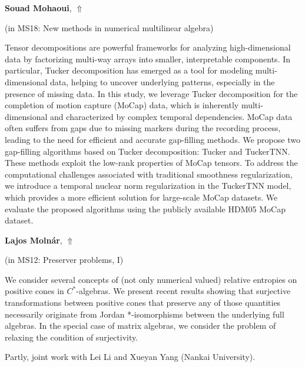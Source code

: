 \documentclass[ILAS2025-program.tex]{subfiles}
\begin{document}
\hypertarget{down0191}{}\begin{ilasabstract}
    
\textbf{Souad Mohaoui},  \hfill \hyperlink{up0191}{$\Uparrow$}
    
    
(in {\color{mstitle}MS18: New methods in numerical multilinear algebra})
        
\mtskip
    Tensor decompositions are powerful frameworks for analyzing high-dimensional data by factorizing multi-way arrays into smaller, interpretable components. In particular, Tucker decomposition has emerged as a tool for modeling multi-dimensional data, helping to uncover underlying patterns, especially in the presence of missing data. In this study, we leverage Tucker decomposition for the completion of motion capture (MoCap) data, which is inherently multi-dimensional and characterized by complex temporal dependencies. MoCap data often suffers from gaps due to missing markers during the recording process, leading to the need for efficient and accurate gap-filling methods. We propose two gap-filling algorithms based on Tucker decomposition: Tucker and TuckerTNN. These methods exploit the low-rank properties of MoCap tensors. To address the computational challenges associated with traditional smoothness regularization, we introduce a temporal nuclear norm regularization in the TuckerTNN model, which provides a more efficient solution for large-scale MoCap datasets. We evaluate the proposed algorithms using the publicly available HDM05 MoCap dataset.
\end{ilasabstract}
    

\hypertarget{down0018}{}\begin{ilasabstract}
    
\textbf{Lajos Molnár},  \hfill \hyperlink{up0018}{$\Uparrow$}
    
    
(in {\color{mstitle}MS12: Preserver problems, I})
        
\mtskip
    We consider several concepts of (not only numerical valued) relative entropies on positive cones in $C^*$-algebras. We present recent results showing that surjective transformations between positive cones that preserve any of those quantities necessarily originate from Jordan *-isomorphisms between the underlying full algebras. In the special case of matrix algebras, we consider the problem of relaxing the condition of surjectivity.

Partly, joint work with Lei Li and Xueyan Yang (Nankai University).

\end{ilasabstract}
    
\end{document}
